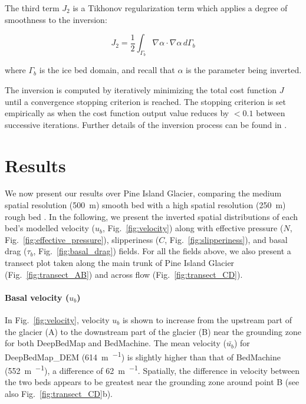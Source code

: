 The third term $J_2$ is a Tikhonov regularization term which applies a degree of smoothness to the inversion:

\begin{equation}
  J_2 = \frac{1}{2} \int_{\Gamma_b} \nabla\alpha \cdot \nabla\alpha \,d\Gamma_b
\end{equation}

where $\Gamma_b$ is the ice bed domain, and recall that $\alpha$ is the parameter being inverted.

The inversion is computed by iteratively minimizing the total cost function $J$ until a convergence stopping criterion is reached.
The stopping criterion is set empirically as when the cost function output value reduces by $<0.1$ between successive iterations.
Further details of the inversion process can be found in \citet{MorlighemInversionbasalfriction2013}.

\clearpage
\section{Results} \label{sec:results}

We now present our results over Pine Island Glacier, comparing the medium spatial resolution (\SI{500}{\metre}) smooth bed \citep[BedMachine v2;][]{MorlighemMEaSUREsBedMachineAntarctica2020} with a high spatial resolution (\SI{250}{\metre}) rough bed \citep[DeepBedMap\_DEM v1.1;][]{LeongDeepBedMap2020}.
In the following, we present the inverted spatial distributions of each bed's modelled velocity ($u_b$, Fig.~\ref{fig:velocity}) along with effective pressure ($N$, Fig.~\ref{fig:effective_pressure}), slipperiness ($C$, Fig.~\ref{fig:slipperiness}), and basal drag ($\tau_b$, Fig.~\ref{fig:basal_drag}) fields.
For all the fields above, we also present a transect plot taken along the main trunk of Pine Island Glacier (Fig.~\ref{fig:transect_AB}) and across flow (Fig.~\ref{fig:transect_CD}).

\paragraph{Basal velocity ($u_b$)}

In Fig.~\ref{fig:velocity}, velocity $u_b$ is shown to increase from the upstream part of the glacier (A) to the downstream part of the glacier (B) near the grounding zone for both DeepBedMap and BedMachine.
The mean velocity ($\bar{u_b}$) for DeepBedMap\_DEM (\SI{614}{\metre\per\year}) is slightly higher than that of BedMachine (\SI{552}{\metre\per\year}), a difference of \SI{62}{\metre\per\year}.
Spatially, the difference in velocity between the two beds appears to be greatest near the grounding zone around point B (see also Fig.~\ref{fig:transect_CD}b).

